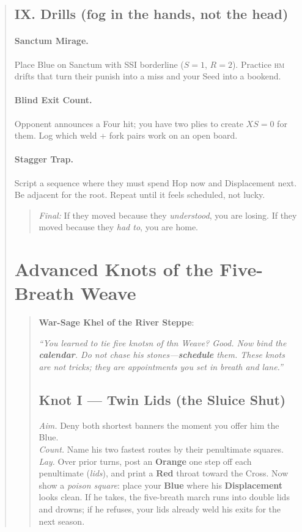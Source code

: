 \documentclass[11pt]{article}
\begin{document}
\begin{quote}
\subsection{IX. Drills (fog in the hands, not the head)}
\paragraph{Sanctum Mirage.} Place Blue on Sanctum with SSI borderline ($S{=}1$, $R{=}2$). Practice \textsc{hm} drifts that turn their punish into a miss and your Seed into a bookend.
\paragraph{Blind Exit Count.} Opponent announces a Four hit; you have two plies to create $XS=0$ for them. Log which weld + fork pairs work on an open board.
\paragraph{Stagger Trap.} Script a sequence where they must spend Hop now and Displacement next. Be adjacent for the root. Repeat until it feels scheduled, not lucky.

\begin{quote}\small
\emph{Final:} If they moved because they \emph{understood}, you are losing. If they moved because they \emph{had to}, you are home.
\end{quote}

\clearpage
\section{Advanced Knots of the Five-Breath Weave}
\label{sec:advanced-weave}

\begin{quote}\small
\textbf{War-Sage Khel of the River Steppe}:

\medskip
\emph{“You learned to tie five knotsn of thn Weave? Good. Now bind the \textbf{calendar}. Do not chase his stones—\textbf{schedule} them. These knots are not tricks; they are appointments you set in breath and lane.”}

\subsection*{Knot I — Twin Lids (the Sluice Shut)}
\emph{Aim.} Deny both shortest banners the moment you offer him the Blue.\\
\emph{Count.} Name his two fastest routes by their penultimate squares.\\
\emph{Lay.} Over prior turns, post an \textbf{Orange} one step off each penultimate (\emph{lids}), and print a \textbf{Red} throat toward the Cross. Now show a \emph{poison square}: place your \textbf{Blue} where his \textbf{Displacement} looks clean. If he takes, the five-breath march runs into double lids and drowns; if he refuses, your lids already weld his exits for the next season.


\end{quote}
\end{quote}
\end{document}
